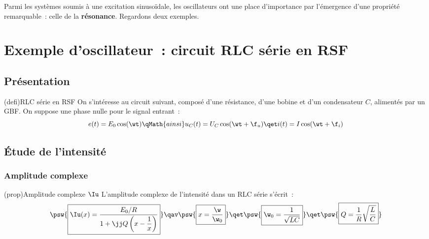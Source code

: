 \documentclass[../../main/main.tex]{subfiles}
\begin{document}
\vspace*{\fill}

\newpage

Parmi les systèmes soumis à une excitation sinusoïdale, les oscillateurs ont une
place d'importance par l'émergence d'une propriété remarquable~: celle de la
\textbf{résonance}. Regardons deux exemples.

\section{Exemple d'oscillateur~: circuit RLC série en RSF}
\subsection{Présentation}

\begin{tcb}(defi){RLC série en RSF}
	On s'intéresse au circuit suivant, composé d'une résistance, d'une bobine et
	d'un condensateur $C$, alimentés par un GBF. On suppose une phase nulle pour
	le signal entrant~:
	\[
		e(t) = E_0 \cos(\wt)
		\qMath{ainsi}
		u_C(t) = U_C \cos(\wt+\f_u)
		\qet
		i(t) = I \cos(\wt+\f_i)
	\]
	\tcblower
	\begin{center}
	\end{center}
\end{tcb}

\subsection{Étude de l'intensité}
\subsubsection{Amplitude complexe}
\begin{tcb}(prop){Amplitude complexe $\Iu$}
	L'amplitude complexe de l'intensité dans un RLC série s'écrit~:
	\begin{gather*}
		\psw{
			\boxed{
				\Iu(x) = \frac{E_0/R}{1 + \jj Q \left( x - \dfrac{1}{x} \right)}}
		}
		\qav
		\psw{\boxed{x = \frac{\w}{\w_0}}}
		\qet
		\psw{\boxed{\w_0 = \frac{1}{\sqrt{LC}}}}
		\qet
		\psw{\boxed{Q = \frac{1}{R}\sqrt{\frac{L}{C}}}}
	\end{gather*}
	\vspace{-15pt}
\end{tcb}
\end{document}
